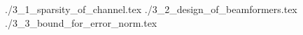 \startchapter [title={Error Analysis}]

 {./3_1_sparsity_of_channel.tex}
 {./3_2_design_of_beamformers.tex}
 {./3_3_bound_for_error_norm.tex}

\stopchapter
